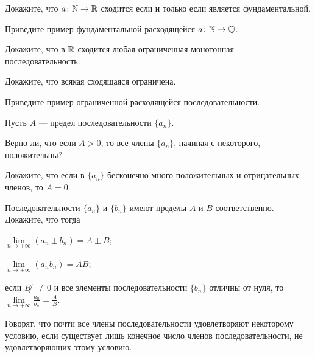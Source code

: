 \documentclass[a4paper, 12pt, num=30]{listok}
\begin{document}
\begin{problem}
    Докажите, что $a \colon \mathbb{N} \to \mathbb{R}$ сходится если и только если является фундаментальной.
\end{problem}
\begin{problem}
    Приведите пример фундаментальной расходящейся $a \colon \mathbb{N} \to \mathbb{Q}$.
\end{problem}
\begin{problem}
    Докажите, что в $\mathbb{R}$ сходится любая ограниченная монотонная последовательность.
\end{problem}
\begin{problem}
    \begin{probparts}
        \item Докажите, что всякая сходящаяся ограничена.
        \item Приведите пример ограниченной расходящейся последовательности.
    \end{probparts}
\end{problem}
\begin{problem}
    Пусть $A$ --- предел последовательности $\{a_n\}$.
    \begin{probparts}
        \item Верно ли, что если $A > 0$, то все члены $\{a_n\}$, начиная с некоторого, положительны?
        \item Докажите, что если в $\{a_n\}$ бесконечно много положительных и отрицательных членов, то $A = 0$.
    \end{probparts}
\end{problem}
\begin{problem}
    Последовательности $\{a_n\}$ и $\{b_n\}$ имеют пределы $A$ и $B$ соответственно.
    Докажите, что тогда
    \begin{probenum}
        \item $\lim\limits_{n \to +\infty} (a_n \pm b_n) = A \pm B$;
        \item $\lim\limits_{n \to +\infty} (a_n  b_n) = A B$;
        \item если $B ̸\ne 0$ и все элементы последовательности $\{b_n\}$ отличны от нуля, то
            $\lim\limits_{n \to +\infty} \frac{a_n}{b_n} = \frac AB$.
    \end{probenum}
\end{problem}
\begin{definition}
    Говорят, что почти все члены последовательности удовлетворяют некоторому условию,
    если существует лишь конечное число членов последовательности, не удовлетворяющих этому условию.
\end{definition}
\end{document}
